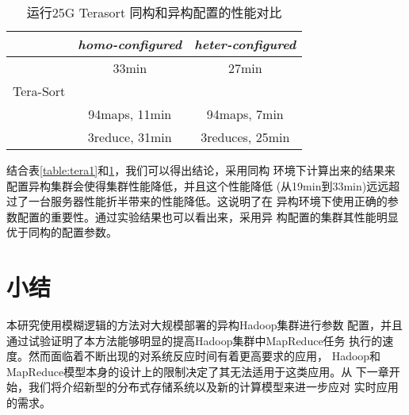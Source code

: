 \begin{table}[h!]\small
  \caption{运行25G Terasort 同构和异构配置的性能对比}
  \label{table:tera2}
  \centering
  \begin{tabular}{|c|c|c|}
    \hline
    & \textit{homo-configured} & \textit{heter-configured}\\
    \hline
    & 33min & 27min\\
    Tera-Sort & &\\
    & 94maps, 11min & 94maps, 7min\\
    & 3reduce, 31min & 3reduces, 25min\\
    \hline
  \end{tabular}
\end{table}

结合表\ref{table:tera1}和\ref{table:tera2}，我们可以得出结论，采用同构
环境下计算出来的结果来配置异构集群会使得集群性能降低，并且这个性能降低
(从19min到33min)远远超过了一台服务器性能折半带来的性能降低。这说明了在
异构环境下使用正确的参数配置的重要性。通过实验结果也可以看出来，采用异
构配置的集群其性能明显优于同构的配置参数。

\section{小结}
本研究使用模糊逻辑的方法对大规模部署的异构Hadoop集群进行参数
配置，并且通过试验证明了本方法能够明显的提高Hadoop集群中MapReduce任务
执行的速度。然而面临着不断出现的对系统反应时间有着更高要求的应用，
Hadoop和MapReduce模型本身的设计上的限制决定了其无法适用于这类应用。从
下一章开始，我们将介绍新型的分布式存储系统以及新的计算模型来进一步应对
实时应用的需求。
